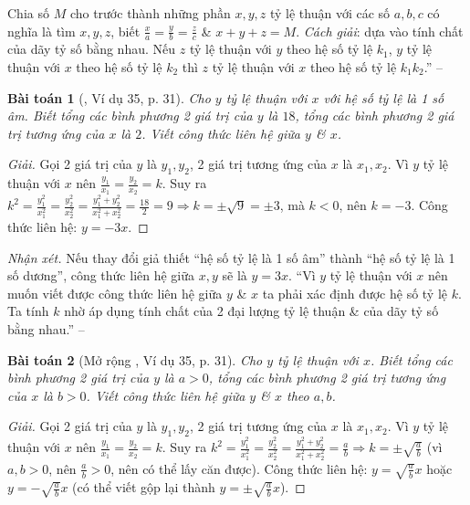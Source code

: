 \documentclass{article}
\newtheorem{baitoan}{Bài toán}
\begin{document}
	 Chia số $M$ cho trước thành những phần $x,y,z$ tỷ lệ thuận với các số $a,b,c$ có nghĩa là tìm $x,y,z$, biết $\frac{x}{a} = \frac{y}{b} = \frac{z}{c}$ \& $x + y + z = M$. \textit{Cách giải}: dựa vào tính chất của dãy tỷ số bằng nhau.
	 Nếu $z$ tỷ lệ thuận với $y$ theo hệ số tỷ lệ $k_1$, $y$ tỷ lệ thuận với $x$ theo hệ số tỷ lệ $k_2$ thì $z$ tỷ lệ thuận với $x$ theo hệ số tỷ lệ $k_1k_2$.'' -- \cite[Chap. 2, \S7, pp. 30--31]{Tuyen_Toan_7}


\begin{baitoan}[\cite{Tuyen_Toan_7}, Ví dụ 35, p. 31]
	Cho $y$ tỷ lệ thuận với $x$ với hệ số tỷ lệ là 1 số âm. Biết tổng các bình phương 2 giá trị của $y$ là $18$, tổng các bình phương 2 giá trị tương ứng của $x$ là $2$. Viết công thức liên hệ giữa $y$ \& $x$.
\end{baitoan}

\begin{proof}[Giải]
	Gọi 2 giá trị của $y$ là $y_1,y_2$, 2 giá trị tương ứng của $x$ là $x_1,x_2$. Vì $y$ tỷ lệ thuận với $x$ nên $\frac{y_1}{x_1} = \frac{y_2}{x_2} = k$. Suy ra $k^2 = \frac{y_1^2}{x_1^2} = \frac{y_2^2}{x_2^2} = \frac{y_1^2 + y_2^2}{x_1^2 + x_2^2} = \frac{18}{2} = 9\Rightarrow k = \pm\sqrt{9} = \pm3$, mà $k < 0$, nên $k = -3$. Công thức liên hệ: $y = -3x$. 
\end{proof}
\noindent\textit{Nhận xét.} Nếu thay đổi giả thiết ``hệ số tỷ lệ là 1 số âm'' thành ``hệ số tỷ lệ là 1 số dương'', công thức liên hệ giữa $x,y$ sẽ là $y = 3x$. ``Vì $y$ tỷ lệ thuận với $x$ nên muốn viết được công thức liên hệ giữa $y$ \& $x$ ta phải xác định được hệ số tỷ lệ $k$. Ta tính $k$ nhờ áp dụng tính chất của 2 đại lượng tỷ lệ thuận \& của dãy tỷ số bằng nhau.'' -- \cite[p. 31]{Tuyen_Toan_7}

\begin{baitoan}[Mở rộng \cite{Tuyen_Toan_7}, Ví dụ 35, p. 31]
	Cho $y$ tỷ lệ thuận với $x$. Biết tổng các bình phương 2 giá trị của $y$ là $a > 0$, tổng các bình phương 2 giá trị tương ứng của $x$ là $b > 0$. Viết công thức liên hệ giữa $y$ \& $x$ theo $a,b$.
\end{baitoan}

\begin{proof}[Giải]
	Gọi 2 giá trị của $y$ là $y_1,y_2$, 2 giá trị tương ứng của $x$ là $x_1,x_2$. Vì $y$ tỷ lệ thuận với $x$ nên $\frac{y_1}{x_1} = \frac{y_2}{x_2} = k$. Suy ra $k^2 = \frac{y_1^2}{x_1^2} = \frac{y_2^2}{x_2^2} = \frac{y_1^2 + y_2^2}{x_1^2 + x_2^2} = \frac{a}{b}\Rightarrow k = \pm\sqrt{\frac{a}{b}}$ (vì $a,b > 0$, nên $\frac{a}{b} > 0$, nên có thể lấy căn được). Công thức liên hệ: $y = \sqrt{\frac{a}{b}}x$ hoặc $y = -\sqrt{\frac{a}{b}}x$ (có thể viết gộp lại thành $y = \pm\sqrt{\frac{a}{b}}x$). 
\end{proof}
\end{document}
